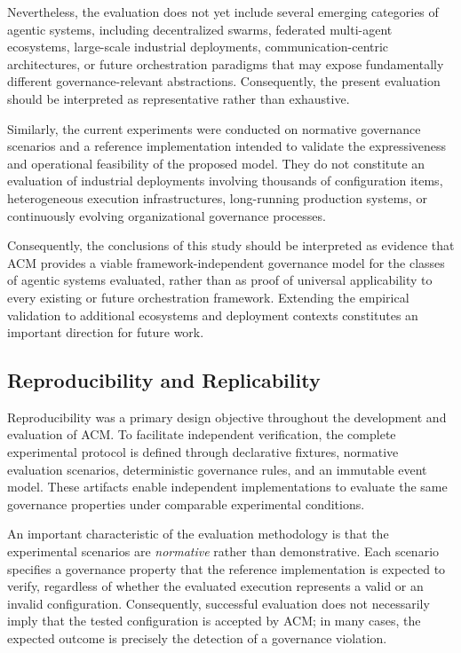 \documentclass[10pt]{article}
\begin{document}
Nevertheless, the evaluation does not yet include several emerging categories of agentic systems, including decentralized swarms, federated multi-agent ecosystems, large-scale industrial deployments, communication-centric architectures, or future orchestration paradigms that may expose fundamentally different governance-relevant abstractions. Consequently, the present evaluation should be interpreted as representative rather than exhaustive.

Similarly, the current experiments were conducted on normative governance scenarios and a reference implementation intended to validate the expressiveness and operational feasibility of the proposed model. They do not constitute an evaluation of industrial deployments involving thousands of configuration items, heterogeneous execution infrastructures, long-running production systems, or continuously evolving organizational governance processes.

Consequently, the conclusions of this study should be interpreted as evidence that ACM provides a viable framework-independent governance model for the classes of agentic systems evaluated, rather than as proof of universal applicability to every existing or future orchestration framework. Extending the empirical validation to additional ecosystems and deployment contexts constitutes an important direction for future work.

\subsection{Reproducibility and Replicability}
\label{subsec:reproducibility}

Reproducibility was a primary design objective throughout the development and evaluation of ACM. To facilitate independent verification, the complete experimental protocol is defined through declarative fixtures, normative evaluation scenarios, deterministic governance rules, and an immutable event model. These artifacts enable independent implementations to evaluate the same governance properties under comparable experimental conditions.

An important characteristic of the evaluation methodology is that the
experimental scenarios are \emph{normative} rather than demonstrative. Each scenario specifies a governance property that the reference implementation is expected to verify, regardless of whether the evaluated execution represents a valid or an invalid configuration. Consequently, successful evaluation does not necessarily imply that the tested configuration is accepted by ACM; in many cases, the expected outcome is precisely the detection of a governance
violation.
\end{document}
